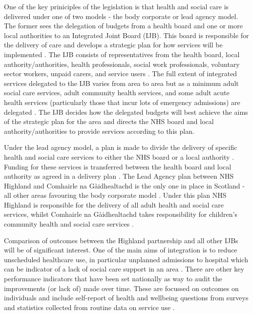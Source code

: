 \documentclass[12pt,]{report}
\begin{document}
One of the key priniciples of the legislation is that health and social
care is delivered under one of two models - the body corporate or lead
agency model. The former sees the delegation of budgets from a health
board and one or more local authorities to an Integrated Joint Board
(IJB). This board is responsible for the delivery of care and develops a
strategic plan for how services will be implemented
\citep{RN455, RN232, RN366}. The IJB consists of representatives from
the health board, local authority/authorities, health professionals,
social work professionals, voluntary sector workers, unpaid carers, and
service users \citep{RN252, RN232}. The full extent of integrated
services delegated to the IJB varies from area to area but as a minimum
adult social care services, adult community health services, and some
adult acute health services (particularly those that incur lots of
emergency admissions) are delegated \citep{RN455, RN252, RN232, RN366}.
The IJB decides how the delegated budgets will best achieve the aims of
the strategic plan for the area and directs the NHS board and local
authority/authorities to provide services according to this
plan\citep{RN252, RN366}.

Under the lead agency model, a plan is made to divide the delivery of
specific health and social care services to either the NHS board or a
local authority \citep{RN455, RN252, RN232, RN366}. Funding for these
services is transferred between the health board and local authority as
agreed in a delivery plan \citep{RN252, RN366}. The Lead Agency plan
between NHS Highland and Comhairle na Gàidhealtachd is the only one in
place in Scotland - all other areas favouring the body corporate model
\citep{RN455, RN252, RN232, RN366}. Under this plan NHS Highland is
responsible for the delivery of all adult health and social care
services, whilst Comhairle na Gàidhealtachd takes responsibility for
children's community health and social care services
\citep{RN232, RN366}.

Comparison of outcomes between the Highland partnership and all other
IJBs will be of significant interest. One of the main aims of
integration is to reduce unscheduled healthcare use, in particular
unplanned admissions to hospital which can be indicator of a lack of
social care support in an area \citep{RN455, RN252, RN251}. There are
other key performance indicators that have been set nationally as way to
audit the improvements (or lack of) made over time. These are focussed
on outcomes on individuals and include self-report of health and
wellbeing questions from surveys and statistics collected from routine
data on service use \citep{RN465, RN464, RN366}.
\end{document}
